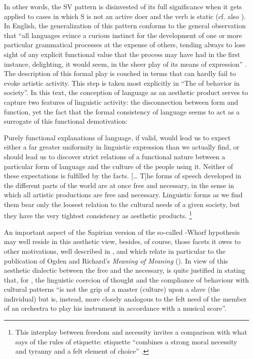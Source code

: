 \documentclass[output=paper]{langscibook}
\begin{document}
In other words, the SV pattern is disinvested of its full significance when it gets applied to cases in which S is not an active doer and the verb is static (cf. also \citealt[14--15]{Sapir1921}). In English, the generalization of this pattern conforms to the general observation that ``all languages evince a curious instinct for the development of one or more particular grammatical processes at the expense of others, tending always to lose sight of any explicit functional value that the process may have had in the first instance, delighting, it would seem, in the sheer play of its means of expression'' \citep[60]{Sapir1921}. The description of this formal play is couched in terms that can hardly fail to evoke artistic activity. This step is taken most explicitly in ``The  of behavior in society''. In this text, the conception of language as an aesthetic product serves to capture two features of linguistic activity: the disconnection between form and function, yet the fact that the formal consistency of language seems to act as a surrogate of this functional demotivation:

\begin{modquote}
Purely functional explanations of language, if valid, would lead us to expect either a far greater uniformity in linguistic expression than we actually find, or should lead us to discover strict relations of a functional nature between a particular form of language and the culture of the people using it. Neither of these expectations is fulfilled by the facts. [… T]he forms of speech developed in the different parts of the world are at once free and necessary, in the sense in which all artistic productions are free and necessary. Linguistic forms as we find them bear only the loosest relation to the cultural needs of a given society, but they have the very tightest consistency as aesthetic products. \citep[550]{Sapir1927b}\footnote{This interplay between freedom and necessity invites a comparison with what {\Sapir} says of the rules of etiquette: etiquette ``combines a strong moral necessity and tyranny and a felt element of choice'' \citep[236]{Sapir2002}.} 
\end{modquote}

An important aspect of the Sapirian version of the so-called {\Sapir}-Whorf hypothesis may well reside in this aesthetic view, besides, of course, those facets it owes to other motivations, well described in \citet{Joseph2002sapirwhorf}, and which relate in particular to the publication of Ogden and Richard's \emph{Meaning of Meaning} (\citeyear{Ogden1923}). In view of this aesthetic dialectic between the free and the necessary, \citet[462]{Allen1986} is quite justified in stating that, for {\Sapir}, the linguistic coercion of thought and the compliance of behaviour with cultural patterns ``is not the grip of a master (culture) upon a slave (the individual) but is, instead, more closely analogous to the felt need of the member of an orchestra to play his instrument in accordance with a musical score''.
\end{document}
